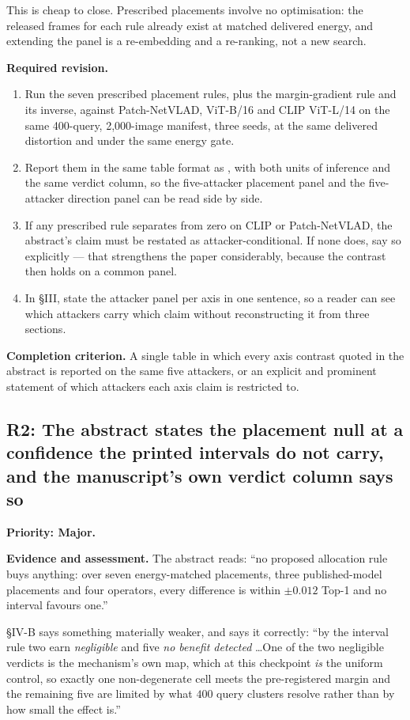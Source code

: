 \documentclass[11pt,a4paper]{article}
\newcommand{\finding}[3]{\subsection{#1: #3}\label{rev:#1}\textbf{Priority: #2.}}
\newcommand{\file}[1]{\path{#1}}
\newcommand{\evidence}{\par\textbf{Evidence and assessment.} }
\newcommand{\action}{\par\textbf{Required revision.} }
\newcommand{\acceptance}{\par\textbf{Completion criterion.} }
\begin{document}
This is cheap to close. Prescribed placements involve no optimisation: the
released frames for each rule already exist at matched delivered energy, and
extending the panel is a re-embedding and a re-ranking, not a new search.

\action
\begin{enumerate}
\item Run the seven prescribed placement rules, plus the margin-gradient rule
  and its inverse, against Patch-NetVLAD, ViT-B/16 and CLIP ViT-L/14 on the
  same 400-query, 2{,}000-image manifest, three seeds, at the same delivered
  distortion and under the same energy gate.
\item Report them in the same table format as
  \file{tab\_placement\_msls.tex}, with both units of inference and the same
  verdict column, so the five-attacker placement panel and the five-attacker
  direction panel can be read side by side.
\item If any prescribed rule separates from zero on CLIP or Patch-NetVLAD,
  the abstract's claim must be restated as attacker-conditional. If none does,
  say so explicitly --- that strengthens the paper considerably, because the
  contrast then holds on a common panel.
\item In \S III, state the attacker panel per axis in one sentence, so a reader
  can see which attackers carry which claim without reconstructing it from
  three sections.
\end{enumerate}

\acceptance
A single table in which every axis contrast quoted in the abstract is reported
on the same five attackers, or an explicit and prominent statement of which
attackers each axis claim is restricted to.

\finding{R2}{Major}{The abstract states the placement null at a confidence the
printed intervals do not carry, and the manuscript's own verdict column says so}

\evidence
The abstract reads: ``no proposed allocation rule buys anything: over seven
energy-matched placements, three published-model placements and four operators,
every difference is within $\pm0.012$ Top-1 and no interval favours one.''

\S IV-B says something materially weaker, and says it correctly: ``by the
interval rule two earn \emph{negligible} and five \emph{no benefit detected}
\ldots One of the two negligible verdicts is the mechanism's own map, which at
this checkpoint \emph{is} the uniform control, so exactly one non-degenerate
cell meets the pre-registered margin and the remaining five are limited by what
$400$ query clusters resolve rather than by how small the effect is.''
\end{document}
